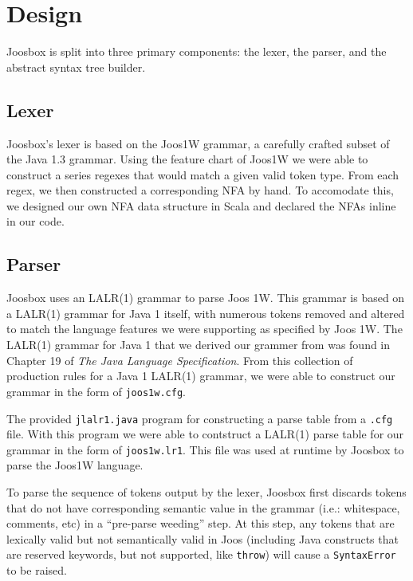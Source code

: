 \documentclass[letterpaper]{article}
\begin{document}
  \section{Design}

  Joosbox is split into three primary components: the lexer, the parser, and
  the abstract syntax tree builder.

  \subsection{Lexer}

  Joosbox's lexer is based on the Joos1W grammar, a carefully crafted subset
  of the Java 1.3 grammar. Using the feature chart of Joos1W we were able to
  construct a series regexes that would match a given valid token type. From
  each regex, we then constructed a corresponding NFA by hand. To accomodate
  this, we designed our own NFA data structure in Scala and declared the NFAs
  inline in our code.

  \subsection{Parser}

  Joosbox uses an LALR(1) grammar to parse Joos 1W. This grammar is based on a
  LALR(1) grammar for Java 1 itself, with numerous tokens removed and altered to
  match the language features we were supporting as specified by Joos 1W. The
  LALR(1) grammar for Java 1 that we derived our grammer from was found in
  Chapter 19 of {\em The Java Language Specification}. From this collection of
  production rules for a Java 1 LALR(1) grammar, we were able to construct our
  grammar in the form of {\tt joos1w.cfg}.

  The provided {\tt jlalr1.java} program for constructing a parse table from a
  {\tt.cfg} file. With this program we were able to contstruct a LALR(1) parse
  table for our grammar in the form of {\tt joos1w.lr1}. This file was used at
  runtime by Joosbox to parse the Joos1W language.

  To parse the sequence of tokens output by the lexer, Joosbox first discards
  tokens that do not have corresponding semantic value in the grammar (i.e.:
  whitespace, comments, etc) in a ``pre-parse weeding'' step. At this step,
  any tokens that are lexically valid but not semantically valid in Joos
  (including Java constructs that are reserved keywords, but not supported,
  like {\tt throw}) will cause a {\tt SyntaxError} to be raised.
\end{document}
